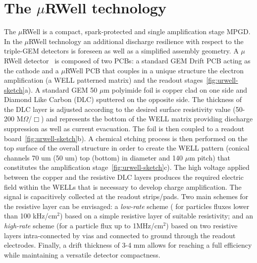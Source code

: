 
\section{The $\mu$RWell technology}
\label{section:Muon-uRWell}


The $\mu$RWell is a compact, spark-protected and single amplification stage MPGD.
In the $\mu$RWell technology an additional discharge resilience with respect to the triple-GEM detectors is foreseen as well as a simplified assembly geometry.  
A $\mu$RWell detector~\cite{urwell} is composed of two PCBs: a standard GEM Drift PCB acting as the cathode and a $\mu$RWell PCB that couples in a unique structure the electron amplification (a WELL patterned matrix) and the readout stages~\ref{fig:urwell-sketch}a). 
A standard GEM 50 $\mu$m polyimide foil is copper clad on one side and Diamond Like Carbon (DLC) sputtered on the opposite side. 
The thickness of the DLC layer is adjusted according to the desired surface resistivity value (50-200 M$\Omega$/$\Box$) and represents the bottom of the WELL matrix providing discharge suppression as well as current evacuation. 
The foil is then coupled to a readout board~\ref{fig:urwell-sketch}b). 
A chemical etching process is then performed on the top surface of the overall structure in order to create the WELL pattern (conical channels 70 um (50 um) top (bottom) in diameter and 140 $\mu$m pitch) that constitutes the amplification stage~\ref{fig:urwell-sketch}c).  
The high voltage applied between the copper and the resistive DLC layers produces the required electric field within the WELLs that is necessary to develop charge amplification. 
The signal is capacitively collected at the readout strips/pads.
Two main schemes for the resistive layer can be envisaged:  a \textit{low-rate} scheme ( for particles fluxes lower than  100 kHz/cm$^2$) based on a simple resistive layer of suitable resistivity; and an \textit{high-rate} scheme  (for a particle flux up to 1MHz/cm$^2$) based on two resistive layers intra-connected by vias and connected to ground through the readout electrodes.  
Finally, a drift thickness of 3-4 mm allows for reaching a full efficiency while maintaining a versatile detector compactness. 

